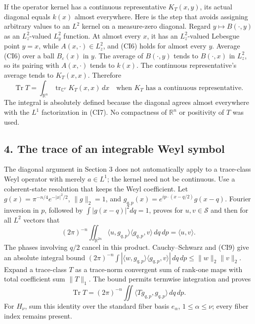\documentclass[
  11pt,
]{article}
\begin{document}
If the operator kernel has a continuous representative \(K_T(x,y)\), its
actual diagonal equals \(k(x)\) almost everywhere. Here is the step that
avoids assigning arbitrary values to an \(L^2\) kernel on a measure-zero
diagonal. Regard \(y\mapsto B(\cdot,y)\) as an \(L^2_z\)-valued
\(L^2_y\) function. At almost every \(x\), it has an \(L^2_z\)-valued
Lebesgue point \(y=x\), while \(A(x,\cdot)\in L^2_z\), and (CI6) holds
for almost every \(y\). Average (CI6) over a ball \(B_\varepsilon(x)\)
in \(y\). The average of \(B(\cdot,y)\) tends to \(B(\cdot,x)\) in
\(L^2_z\), so its pairing with \(A(x,\cdot)\) tends to \(k(x)\). The
continuous representative's average tends to \(K_T(x,x)\). Therefore \[
 \operatorname{Tr}T
   =\int_{\mathbb R^n}\operatorname{tr}_{\mathbb C^\nu}K_T(x,x)\,dx
 \quad\text{when }K_T\text{ has a continuous representative.}
 \tag{CI8}
\] The integral is absolutely defined because the diagonal agrees almost
everywhere with the \(L^1\) factorization in (CI7). No compactness of
\(\mathbb R^n\) or positivity of \(T\) was used.

\subsection{4. The trace of an integrable Weyl
symbol}\label{the-trace-of-an-integrable-weyl-symbol}

The diagonal argument in Section 3 does not automatically apply to a
trace-class Weyl operator with merely \(a\in L^1\); the kernel need not
be continuous. Use a coherent-state resolution that keeps the Weyl
coefficient. Let \(g(x)=\pi^{-n/4}e^{-|x|^2/2}\), \(\|g\|_2=1\), and
\(g_{q,p}(x)=e^{ip\cdot(x-q/2)}g(x-q)\). Fourier inversion in \(p\),
followed by \(\int|g(x-q)|^2dq=1\), proves for \(u,v\in\mathcal S\) and
then for all \(L^2\) vectors that \[
 (2\pi)^{-n}\iint_{\mathbb R^{2n}}
       \langle u,g_{q,p}\rangle
       \langle g_{q,p},v\rangle\,dq\,dp
   =\langle u,v\rangle .
 \tag{CI9}
\] The phases involving \(q/2\) cancel in this product. Cauchy--Schwarz
and (CI9) give an absolute integral bound
\((2\pi)^{-n}\int|\langle w,g_{q,p}\rangle
\langle g_{q,p},v\rangle|\,dq\,dp\leq\|w\|_2\|v\|_2\). Expand a
trace-class \(T\) as a trace-norm convergent sum of rank-one maps with
total coefficient sum \(\|T\|_1\). The bound permits termwise
integration and proves \[
 \operatorname{Tr}T
   =(2\pi)^{-n}\iint
          \langle Tg_{q,p},g_{q,p}\rangle\,dq\,dp .
 \tag{CI10}
\] For \(H_\nu\), sum this identity over the standard fiber basis
\(e_\alpha\), \(1\leq\alpha\leq\nu\); every fiber index remains present.
\end{document}
